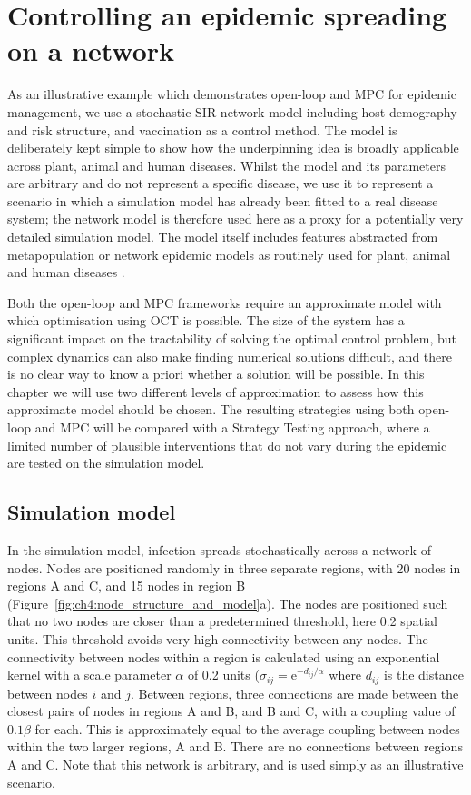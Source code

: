 \section{Controlling an epidemic spreading on a network\label{sec:ch4:Controlling}}

As an illustrative example which demonstrates open-loop and MPC for epidemic management, we use a stochastic SIR network model including host demography and risk structure, and vaccination as a control method. The model is deliberately kept simple to show how the underpinning idea is broadly applicable across plant, animal and human diseases. Whilst the model and its parameters are arbitrary and do not represent a specific disease, we use it to represent a scenario in which a simulation model has already been fitted to a real disease system; the network model is therefore used here as a proxy for a potentially very detailed simulation model. The model itself includes features abstracted from metapopulation or network epidemic models as routinely used for plant, animal and human diseases \citep{rowthorn_optimal_2009, keeling_dynamics_2001, keeling_metapopulation_2000, margosian_connectivity_2009, bansal_individual_2007}.

Both the open-loop and MPC frameworks require an approximate model with which optimisation using OCT is possible. The size of the system has a significant impact on the tractability of solving the optimal control problem, but complex dynamics can also make finding numerical solutions difficult, and there is no clear way to know a priori whether a solution will be possible. In this chapter we will use two different levels of approximation to assess how this approximate model should be chosen. The resulting strategies using both open-loop and MPC will be compared with a Strategy Testing approach, where a limited number of plausible interventions that do not vary during the epidemic are tested on the simulation model. 

\subsection{Simulation model}

In the simulation model, infection spreads stochastically across a network of nodes. Nodes are positioned randomly in three separate regions, with 20 nodes in regions A and C, and 15 nodes in region B (Figure~\ref{fig:ch4:node_structure_and_model}a). The nodes are positioned such that no two nodes are closer than a predetermined threshold, here 0.2 spatial units. This threshold avoids very high connectivity between any nodes. The connectivity between nodes within a region is calculated using an exponential kernel with a scale parameter $\alpha$ of 0.2 units ($\sigma_{ij} = \mathrm{e}^{-d_{ij}/\alpha}$ where $d_{ij}$ is the distance between nodes $i$ and $j$. Between regions, three connections are made between the closest pairs of nodes in regions A and B, and B and C, with a coupling value of $0.1\beta$ for each. This is approximately equal to the average coupling between nodes within the two larger regions, A and B. There are no connections between regions A and C. Note that this network is arbitrary, and is used simply as an illustrative scenario.

